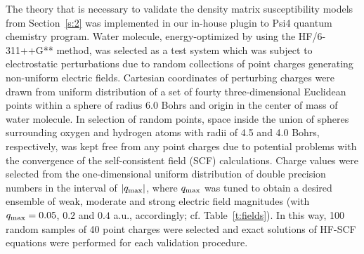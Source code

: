 \documentclass[aip,amsmath,amssymb,reprint,floatfix]{revtex4-1}
\begin{document}
The theory that is necessary to validate the density matrix susceptibility models from Section~\ref{s:2}
was implemented in our in\hyp{}house plugin to {\sc Psi4} quantum chemistry program.\cite{Psi4.JCTC.2017}
Water molecule, energy\hyp{}optimized by using the HF/6-311++G** 
method\cite{Roothaan.RevModPhys.1951,Krishnan.Binkley.Seeger.Pople.JCP.1980}, 
was selected as a test system which was subject to 
electrostatic perturbations due to random collections of point charges
generating non\hyp{}uniform electric fields. 
Cartesian coordinates of perturbing charges were drawn from uniform distribution of a set of fourty
three\hyp{}dimensional Euclidean points within a sphere of radius 6.0 Bohrs
and origin in the center of mass of water molecule.
In selection of random points, space inside the union of spheres surrounding
oxygen and hydrogen atoms with radii of 4.5 and 4.0 Bohrs, respectively, was
kept free from any point charges due to potential problems with the convergence of the 
self\hyp{}consistent field (SCF) calculations.
Charge values were selected from the one\hyp{}dimensional uniform distribution
of double precision numbers in the interval of $\vert q_{\rm max} \vert$, where $q_{\rm max}$
was tuned to obtain a desired ensemble of weak, moderate and strong electric field magnitudes
(with $q_{\rm max}=0.05$, $0.2$ and $0.4$ a.u., accordingly; cf. Table~\ref{t:fields}).
In this way, 100 random samples of 40 point charges were selected and exact solutions of HF\hyp{}SCF equations were 
performed for each validation procedure.
\end{document}
